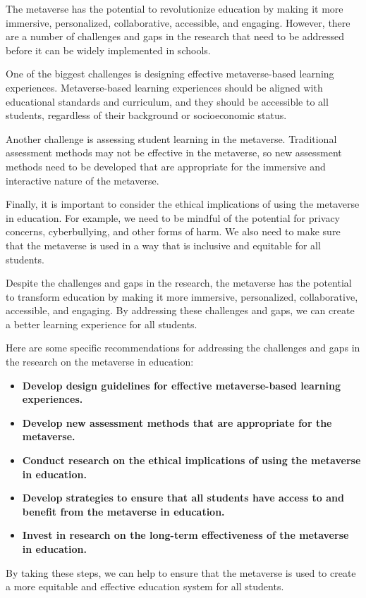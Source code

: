 \documentclass[12pt]{extarticle}
\begin{document}
The metaverse has the potential to revolutionize education by making it more immersive, personalized, collaborative, accessible, and engaging. However, there are a number of challenges and gaps in the research that need to be addressed before it can be widely implemented in schools.

One of the biggest challenges is designing effective metaverse-based learning experiences. Metaverse-based learning experiences should be aligned with educational standards and curriculum, and they should be accessible to all students, regardless of their background or socioeconomic status.

Another challenge is assessing student learning in the metaverse. Traditional assessment methods may not be effective in the metaverse, so new assessment methods need to be developed that are appropriate for the immersive and interactive nature of the metaverse.

Finally, it is important to consider the ethical implications of using the metaverse in education. For example, we need to be mindful of the potential for privacy concerns, cyberbullying, and other forms of harm. We also need to make sure that the metaverse is used in a way that is inclusive and equitable for all students.

Despite the challenges and gaps in the research, the metaverse has the potential to transform education by making it more immersive, personalized, collaborative, accessible, and engaging. By addressing these challenges and gaps, we can create a better learning experience for all students.

Here are some specific recommendations for addressing the challenges and gaps in the research on the metaverse in education:

\begin{itemize}
    \item \textbf{Develop design guidelines for effective metaverse-based learning experiences.}
    \item \textbf{Develop new assessment methods that are appropriate for the metaverse.}
    \item \textbf{Conduct research on the ethical implications of using the metaverse in education.}
    \item \textbf{Develop strategies to ensure that all students have access to and benefit from the metaverse in education.}
    \item \textbf{Invest in research on the long-term effectiveness of the metaverse in education.}
\end{itemize}

By taking these steps, we can help to ensure that the metaverse is used to create a more equitable and effective education system for all students.

\citep{jeong2022metaverse}

\end{document}
